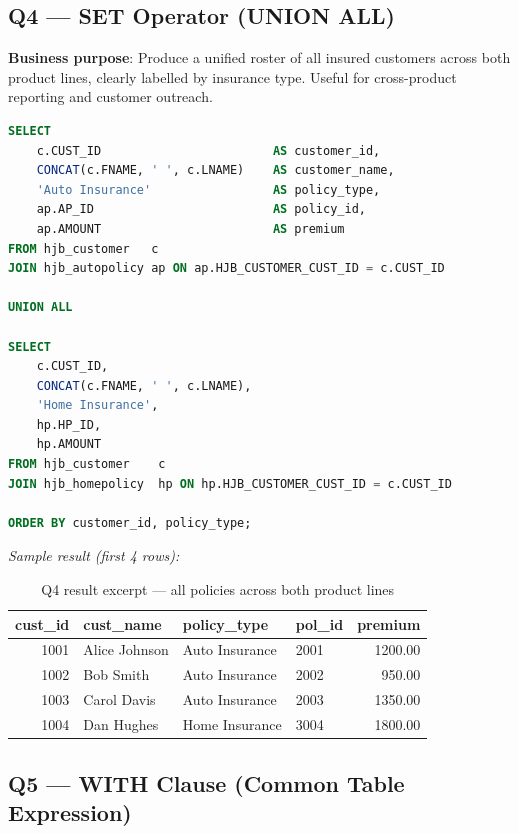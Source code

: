 \documentclass[12pt,letterpaper]{article}
\begin{document}
\subsection{Q4 --- SET Operator (UNION ALL)}

\textbf{Business purpose}: Produce a unified roster of all insured customers across both product lines, clearly labelled by insurance type. Useful for cross-product reporting and customer outreach.

\begin{lstlisting}[language=SQL,caption={Q4: UNION ALL across auto and home policies}]
SELECT
    c.CUST_ID                        AS customer_id,
    CONCAT(c.FNAME, ' ', c.LNAME)    AS customer_name,
    'Auto Insurance'                 AS policy_type,
    ap.AP_ID                         AS policy_id,
    ap.AMOUNT                        AS premium
FROM hjb_customer   c
JOIN hjb_autopolicy ap ON ap.HJB_CUSTOMER_CUST_ID = c.CUST_ID

UNION ALL

SELECT
    c.CUST_ID,
    CONCAT(c.FNAME, ' ', c.LNAME),
    'Home Insurance',
    hp.HP_ID,
    hp.AMOUNT
FROM hjb_customer    c
JOIN hjb_homepolicy  hp ON hp.HJB_CUSTOMER_CUST_ID = c.CUST_ID

ORDER BY customer_id, policy_type;
\end{lstlisting}

\textit{Sample result (first 4 rows):}
\begin{table}[H]
\centering\small
\begin{tabular}{rlllr}
\toprule
\textbf{cust\_id} & \textbf{cust\_name} & \textbf{policy\_type} & \textbf{pol\_id} & \textbf{premium} \\
\midrule
1001 & Alice Johnson & Auto Insurance & 2001 & 1200.00 \\
1002 & Bob Smith     & Auto Insurance & 2002 & 950.00 \\
1003 & Carol Davis   & Auto Insurance & 2003 & 1350.00 \\
1004 & Dan Hughes    & Home Insurance & 3004 & 1800.00 \\
\bottomrule
\end{tabular}
\caption{Q4 result excerpt --- all policies across both product lines}
\end{table}

\subsection{Q5 --- WITH Clause (Common Table Expression)}
\end{document}
